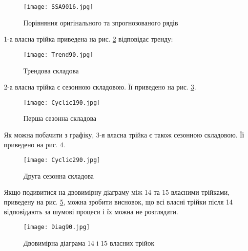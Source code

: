 \vspace{1em}

\begin{figure}[h]
  \texttt{[image: SSA9016.jpg]}
  \caption{Порівняння оригінального та зпрогнозованого рядів}
  \label{fig:SSA9016}
\end{figure}

1-а власна трійка приведена на рис. \ref{fig:Trend90} відповідає тренду:

\newpage

\vspace{1em}

\begin{figure}[h]
  \texttt{[image: Trend90.jpg]}
  \caption{Трендова складова}
  \label{fig:Trend90}
\end{figure}

2-а власна трійка є сезонною складовою. Її приведено на рис. \ref{fig:Cyclic190}.

\vspace{1em}

\begin{figure}[h]
  \texttt{[image: Cyclic190.jpg]}
  \caption{Перша сезонна складова}
  \label{fig:Cyclic190}
\end{figure}

Як можна побачити з графіку, 3-я власна трійка є також сезонною складовою. Її приведено на рис. \ref{fig:Cyclic290}.

\newpage

\vspace{1em}

\begin{figure}[h]
  \texttt{[image: Cyclic290.jpg]}
  \caption{Друга сезонна складова}
  \label{fig:Cyclic290}
\end{figure}


Якщо подивитися на двовимірну діаграму між 14 та 15 власними трійками, приведену на рис. \ref{fig:Diag90}, можна зробити висновок, що всі власні трійки після 14 відповідають за шумові процеси і їх можна не розглядати.


\vspace{1em}

\begin{figure}[h]
  \texttt{[image: Diag90.jpg]}
  \caption{Двовимірна діаграма 14 і 15 власних трійок}
  \label{fig:Diag90}
\end{figure}

